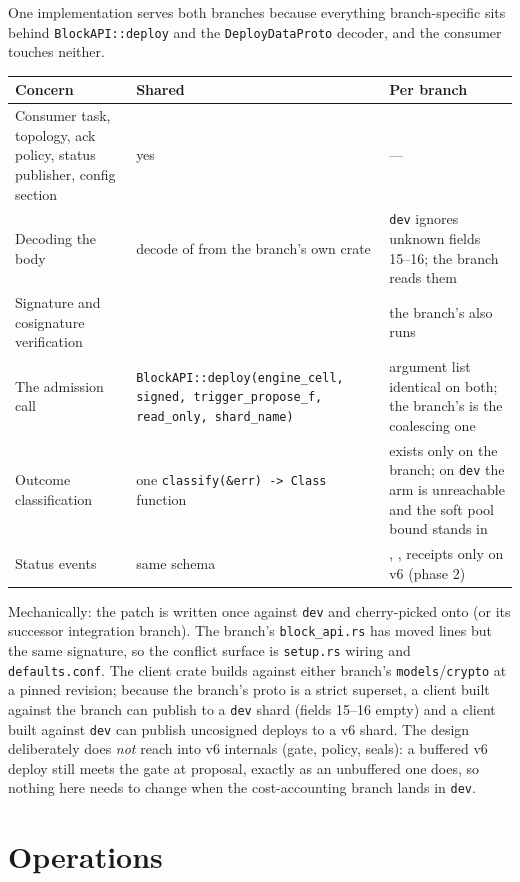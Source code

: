 \documentclass[11pt]{article}
\newcommand{\code}[1]{\texttt{#1}}
\newcommand{\dev}{\code{dev}}
\newcommand{\ote}{\path{feature/rev-stacks-ote}}
\begin{document}
One implementation serves both branches because everything branch-specific sits
behind \code{BlockAPI::deploy} and the \code{DeployDataProto} decoder, and the
consumer touches neither.
\begin{center}\small
\begin{tabularx}{\textwidth}{L{3.4cm} X X}
\toprule
Concern & Shared & Per branch \\
\midrule
Consumer task, topology, ack policy, status publisher, config section & yes & --- \\
Decoding the body &  decode of  from the branch's own  crate & \dev{} ignores unknown fields 15--16; the branch reads them \\
Signature and cosignature verification &  & the branch's  also runs  \\
The admission call & \code{BlockAPI::deploy(engine\_cell, signed, trigger\_propose\_f, read\_only, shard\_name)} & argument list identical on both; the branch's  is the coalescing one \\
Outcome classification & one \code{classify(\&err) -> Class} function &  exists only on the branch; on \dev{} the arm is unreachable and the soft pool bound stands in \\
Status events & same schema & , , receipts only on v6 (phase 2) \\
\bottomrule
\end{tabularx}
\end{center}
Mechanically: the patch is written once against \dev{} and cherry-picked onto \ote{}
(or its successor integration branch). The branch's \code{block\_api.rs} has moved
lines but the same signature, so the conflict surface is \code{setup.rs} wiring and
\code{defaults.conf}. The client crate builds against either branch's
\code{models}/\code{crypto} at a pinned revision; because the branch's proto is a
strict superset, a client built against the branch can publish to a \dev{} shard
(fields 15--16 empty) and a client built against \dev{} can publish uncosigned deploys
to a v6 shard. The design deliberately does \emph{not} reach into v6 internals (gate,
policy, seals): a buffered v6 deploy still meets the gate at proposal, exactly as an
unbuffered one does, so nothing here needs to change when the cost-accounting branch
lands in \dev.

\section{Operations}
\end{document}
